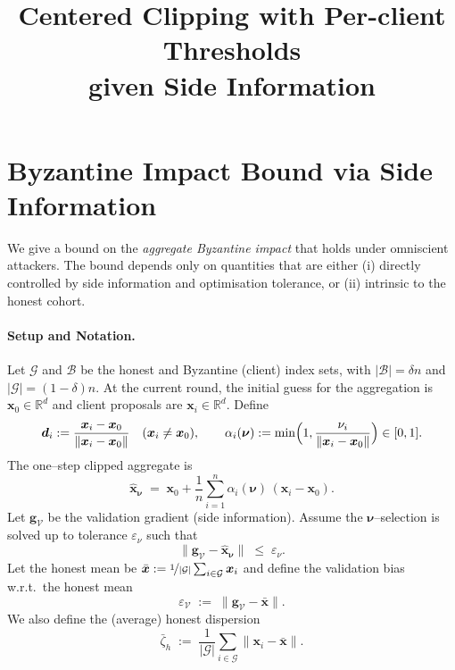 \documentclass{article}
\title{Centered Clipping with Per-client Thresholds\\given Side Information}
\date{}
\theoremstyle{plain}
\theoremstyle{definition}
\theoremstyle{remark}
\begin{document}
\maketitle

\section{Byzantine Impact Bound via Side Information}
\label{sec:worstcase-sideinfo}

We give a bound on the \emph{aggregate Byzantine impact} that holds under omniscient attackers. The bound depends only on quantities that are either (i) directly controlled by side information and optimisation tolerance, or (ii) intrinsic to the honest cohort.

\paragraph{Setup and Notation.}
Let $\mathcal{G}$ and $\mathcal{B}$ be the honest and Byzantine (client) index sets, with
$|\mathcal{B}|=\delta n$ and $|\mathcal{G}|=(1-\delta)n$.
At the current round, the initial guess for the aggregation is $\bm{x}_0\in\mathbb{R}^d$ and client proposals are
$\bm{x}_i\in\mathbb{R}^d$.
%
Define
\[
	\bm{d}_i := \frac{\bm{x}_i-\bm{x}_0}{\|\bm{x}_i-\bm{x}_0\|}\quad(\bm{x}_i\neq \bm{x}_0),
	\qquad
	\alpha_i(\bm{\nu}) := \min\Bigl(1,\frac{\nu_i}{\|\bm{x}_i-\bm{x}_0\|}\Bigr)\in[0,1].
\]
The one–step clipped aggregate is
\[
	\hat{\bm{x}}_{\bm{\nu}}
	\;=\;
	\bm{x}_0 + \frac{1}{n}\sum_{i=1}^n \alpha_i(\bm{\nu})\,(\bm{x}_i-\bm{x}_0).
\]
Let $\bm{g}_{\mathcal{V}}$ be the validation gradient (side information).
Assume the $\bm{\nu}$–selection is solved up to tolerance $\varepsilon_\nu$ such that
\begin{equation}
	\bigl\|\bm{g}_{\mathcal{V}} - \hat{\bm{x}}_{\bm{\nu}}\bigr\| \;\le\; \varepsilon_\nu.	
\label{eq:fit-tol}
\end{equation}
Let the honest mean be $\bar{\bm{x}} := \nicefrac{1}{|\mathcal{G}|}\sum_{i\in\mathcal{G}}\bm{x}_i$
and define the validation bias w.r.t.\ the honest mean
\begin{equation*}
	\varepsilon_{\mathcal{V}} \;:=\; \bigl\|\bm{g}_{\mathcal{V}}-\bar{\bm{x}}\bigr\|.	
\end{equation*}
We also define the (average) honest dispersion
\begin{equation*}
	\bar{\zeta}_h \;:=\; \frac{1}{|\mathcal{G}|}\sum_{i\in\mathcal{G}} \|\bm{x}_i-\bar{\bm{x}}\|.
\end{equation*}
\end{document}
